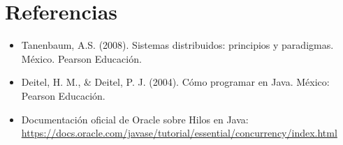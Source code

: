 \documentclass{article}
\begin{document}
\clearpage

\section{Referencias}
\begin{itemize}			
	\item Tanenbaum, A.S. (2008). Sistemas distribuidos: principios y paradigmas. México. Pearson Educación.
    \item Deitel, H. M., \& Deitel, P. J. (2004). Cómo programar en Java. México: Pearson Educación.
    \item Documentación oficial de Oracle sobre Hilos en Java: \url{https://docs.oracle.com/javase/tutorial/essential/concurrency/index.html}
\end{itemize}	
			
\end{document}
